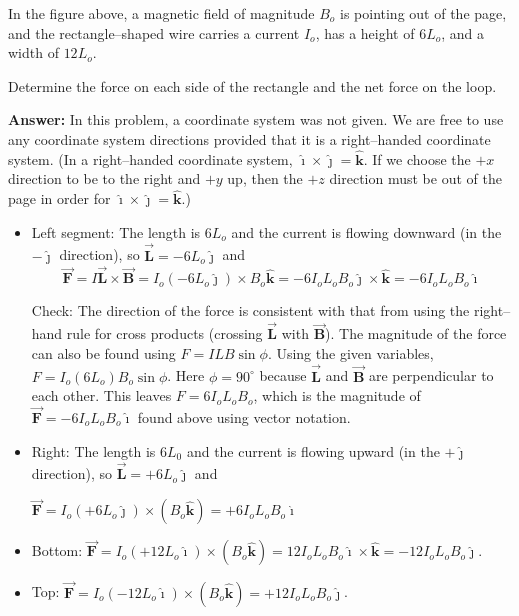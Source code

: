 \documentclass{article}
\newcommand{\ihat}[0]{\hat{\boldsymbol{\imath}}}
\newcommand{\jhat}[0]{\hat{\boldsymbol{\jmath}}}
\newcommand{\khat}[0]{\hat{\boldsymbol{k}}}
\newcommand{\bfvec}[1]{\vec{\mathbf{#1}}}
\begin{document}
In the figure above, a magnetic field of magnitude $B_o$ is pointing out of the page, and the rectangle--shaped wire carries a current $I_o$, has a height of $6L_o$, and a width of $12L_o$.

Determine the force on each side of the rectangle and the net force on the loop.

{\bf Answer: } In this problem, a coordinate system was not given. We are free to use any coordinate system directions provided that it is a right--handed coordinate system. (In a right--handed coordinate system, $\ihat\times\jhat=\khat$. If we choose the $+x$ direction to be to the right and $+y$ up, then the $+z$ direction must be out of the page in order for $\ihat\times\jhat=\khat$.)



\begin{itemize}

  \item Left segment: The length is $6L_o$ and the current is flowing downward (in the $-\jhat$ direction), so $\bfvec{L} = -6L_o\jhat$ and \begin{equation}
        \bfvec{F} = I\bfvec{L}\times\bfvec{B} = I_o(-6L_o\jhat)\times B_o\khat=-6I_oL_oB_o\jhat\times \khat=-6I_oL_oB_o\ihat
        \end{equation}

        Check: The direction of the force is consistent with that from using the right--hand rule for cross products (crossing $\bfvec{L}$ with $\bfvec{B}$). The magnitude of the force can also be found using $F=ILB\sin\phi$. Using the given variables, $F=I_o(6L_o)B_o\sin\phi$. Here $\phi=90^\circ$ because $\bfvec{L}$ and $\bfvec{B}$ are perpendicular to each other. This leaves $F=6I_oL_oB_o$, which is the magnitude of $\bfvec{F}=-6I_oL_oB_o\ihat$ found above using vector notation.

  \item Right: The length is $6L_0$ and the current is flowing upward (in the $+\jhat$ direction), so $\bfvec{L} = +6L_o\jhat$ and

        $\bfvec{F}=I_o(+6L_o\jhat)\times (B_o\khat)=+6I_oL_oB_o\ihat$

  \item Bottom: $\bfvec{F}=I_o(+12L_o\ihat)\times (B_o\khat) = 12I_oL_oB_o\ihat\times\khat = -12I_oL_oB_o\jhat$.

  \item Top: $\bfvec{F}=I_o(-12L_o\ihat)\times (B_o\khat)=+12I_oL_oB_o\jhat$.

\end{itemize}
\end{document}
